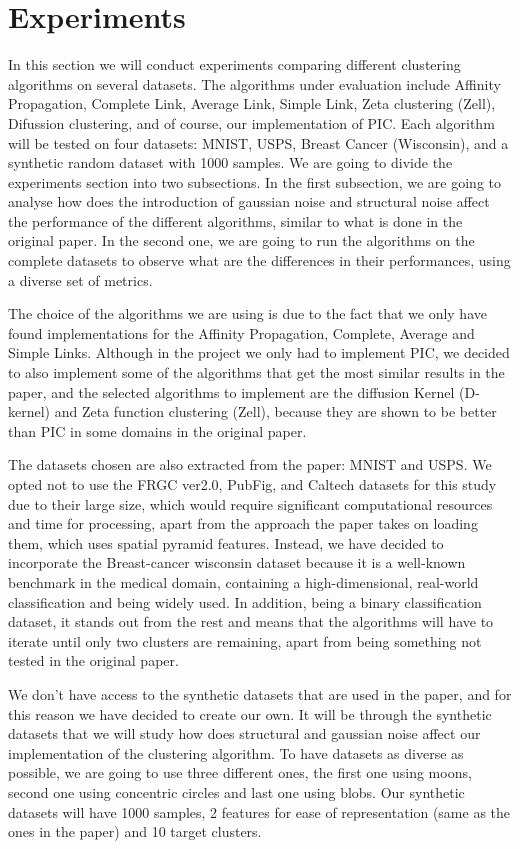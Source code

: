 \documentclass[
	10pt,
	parskip=half-,	
	paper=a4,
	english
	]{scrartcl}
\begin{document}
\section {Experiments}

In this section we will conduct experiments comparing different clustering algorithms on several datasets. The algorithms under evaluation include Affinity Propagation, Complete Link, Average Link, Simple Link, Zeta clustering (Zell), Difussion clustering, and of course, our implementation of PIC. Each algorithm will be tested on four datasets: MNIST, USPS, Breast Cancer (Wisconsin), and a synthetic random dataset with 1000 samples. We are going to divide the experiments section into two subsections. In the first subsection, we are going to analyse how does the introduction of gaussian noise and structural noise affect the performance of the different algorithms, similar to what is done in the original paper. In the second one, we are going to run the algorithms on the complete datasets to observe what are the differences in their performances, using a diverse set of metrics.

The choice of the algorithms we are using is due to the fact that we only have found implementations for the Affinity Propagation, Complete, Average and Simple Links. Although in the project we only had to implement PIC, we decided to also implement some of the algorithms that get the most similar results in the paper, and the selected algorithms to implement are the diffusion Kernel (D-kernel) and Zeta function clustering (Zell), because they are shown to be better than PIC in some domains in the original paper.

The datasets chosen are also extracted from the paper: MNIST and USPS. We opted not to use the FRGC ver2.0, PubFig, and Caltech datasets for this study due to their large size, which would require significant computational resources and time for processing, apart from the approach the paper takes on loading them, which uses spatial pyramid features. Instead, we have decided to incorporate the Breast-cancer wisconsin dataset because it is a well-known benchmark in the medical domain, containing a high-dimensional, real-world classification and being widely used. In addition, being a binary classification dataset, it stands out from the rest and means that the algorithms will have to iterate until only two clusters are remaining, apart from being something not tested in the original paper.

We don't have access to the synthetic datasets that are used in the paper, and for this reason we have decided to create our own. It will be through the synthetic datasets that we will study how does structural and gaussian noise affect our implementation of the clustering algorithm. To have datasets as diverse as possible, we are going to use three different ones, the first one using moons, second one using concentric circles and last one using blobs. Our synthetic datasets will have 1000 samples, 2 features for ease of representation (same as the ones in the paper) and 10 target clusters.
\end{document}
